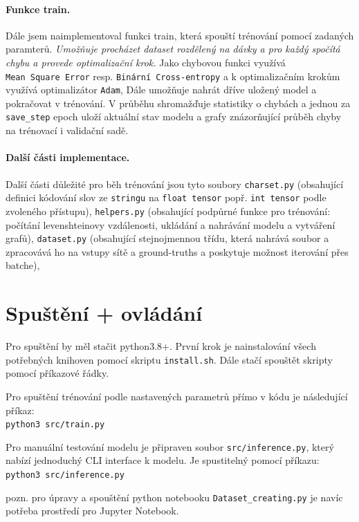 \documentclass[a4paper]{article}
\theoremstyle{definition}
\begin{document}
\paragraph{Funkce train.}
Dále jsem naimplementoval funkci train, která spouští trénování pomocí zadaných paramterů. \textit{Umožňuje procházet dataset rozdělený na dávky a pro každý spočítá chybu a provede optimalizační krok.} Jako chybovou funkci využívá \texttt{Mean\ Square\ Error} resp. \texttt{Binární Cross-entropy} a k optimalizačním krokům využívá optimalizátor \texttt{Adam}, Dále umožňuje nahrát dříve uložený model a pokračovat v trénování. V průběhu shromažďuje statistiky o chybách a jednou za \texttt{save\_step} epoch uloží aktuální stav modelu a grafy znázorňující průběh chyby na trénovací i validační sadě.

\paragraph{Další části implementace.}
Další části důležité pro běh trénování jsou tyto soubory \texttt{charset.py} (obsahující definici kódování slov ze \texttt{stringu} na \texttt{float tensor} popř. \texttt{int tensor} podle zvoleného přístupu), \texttt{helpers.py} (obsahující podpůrné funkce pro trénování: počítání levenshteinovy vzdálenosti, ukládání a nahrávání modelu a vytváření grafů), \texttt{dataset.py} (obsahující stejnojmennou třídu, která nahrává soubor a zpracovává ho na vstupy sítě a ground-truths a poskytuje možnost iterování přes batche),


\section{Spuštění + ovládání}

Pro spuštění by měl stačit python3.8+. První krok je nainstalování všech potřebných knihoven pomocí skriptu \texttt{install.sh}. Dále stačí spouštět skripty pomocí příkazové řádky.

Pro spuštění trénování podle nastavených parametrů přímo v kódu je následující příkaz: \\
\texttt{python3 src/train.py}

Pro manuální testování modelu je připraven soubor \texttt{src/inference.py}, který nabízí jednoduchý CLI interface k modelu. Je spustitelný pomocí příkazu: \\
\texttt{python3 src/inference.py}

pozn. pro úpravy a spouštění python notebooku \texttt{Dataset\_creating.py} je navíc potřeba prostředí pro Jupyter Notebook.
\end{document}
